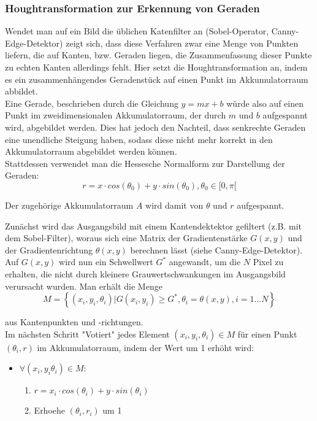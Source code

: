 		\subsubsection{Houghtransformation zur Erkennung von Geraden}
			Wendet man auf ein Bild die üblichen Katenfilter an (Sobel-Operator, Canny-Edge-Detektor) zeigt sich, dass diese Verfahren zwar eine Menge von Punkten liefern, die auf Kanten, bzw. Geraden liegen, die Zusammenfassung dieser Punkte zu echten Kanten allerdings fehlt. Hier setzt die Houghtransformation an, indem es ein zusammenhängendes Geradenstück auf einen Punkt im Akkumulatorraum abbildet. \\
Eine Gerade, beschrieben durch die Gleichung $y = mx + b$ würde also auf einen Punkt im zweidimensionalen Akkumulatorraum, der durch $m$ und $b$ aufgespannt wird, abgebildet werden. Dies hat jedoch den Nachteil, dass senkrechte Geraden eine unendliche Steigung haben, sodass diese nicht mehr korrekt in den Akkumulatorraum abgebildet werden können. \\
Stattdessen verwendet man die Hessesche Normalform zur Darstellung der Geraden:
\begin{equation*}
r = x \cdot cos (\theta _0) + y \cdot sin (\theta _0) , \theta _0 \in [0, \pi [
\end{equation*}

Der zugehörige Akkumulatorraum $A$ wird damit von $\theta$ und $r$ aufgespannt.

Zunächst wird das Ausgangsbild mit einem Kantendektektor gefiltert (z.B. mit dem Sobel-Filter), woraus sich eine Matrix der Gradientenstärke $G(x, y)$ und der Gradientenrichtung $\theta (x, y)$ berechnen lässt (siehe Canny-Edge-Detektor). \\
Auf $G(x, y)$ wird nun ein Schwellwert $G^*$ angewandt, um die $N$ Pixel zu erhalten, die nicht durch kleinere Grauwertschwankungen im Ausgangsbild verursacht wurden.  Man erhält die Menge
\begin{equation*}
M = \left \{ (x_i, y_i, \theta _i) | G(x_i, y_i) \geq G^*, \theta _i=\theta (x, y), i = 1...N \right \}
\end{equation*}

aus Kantenpunkten und -richtungen. \\
Im nächsten Schritt "Votiert" jedes Element $(x_i, y_i, \theta_i) \in M$ für einen Punkt $(\theta_i, r)$ im Akkumulatorraum, indem der Wert um 1 erhöht wird:
\begin{itemize}
\item $\forall (x_i, y_i \theta_i) \in M:$
	\begin{enumerate}
		\item $r = x_i \cdot cos(\theta_i) + y \cdot sin(\theta_i)$
		\item {Erhoehe $(\theta_i, r_i)$ um 1}
	\end{enumerate}
\end{itemize}

